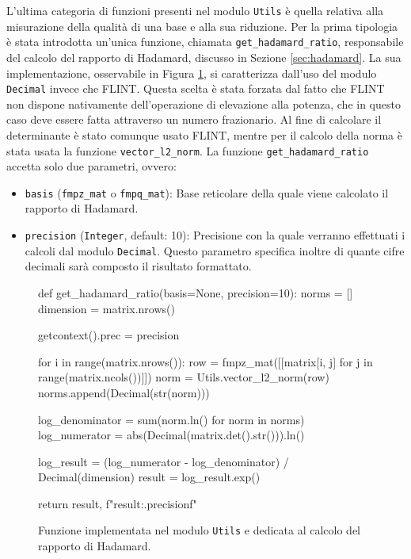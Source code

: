 L'ultima categoria di funzioni presenti nel modulo \texttt{Utils} è quella relativa alla
misurazione della qualità di una base e alla sua riduzione. Per la prima tipologia è 
stata introdotta un'unica funzione, chiamata \texttt{get\_hadamard\_ratio},
responsabile del calcolo del rapporto di Hadamard, discusso
in Sezione \ref{sec:hadamard}. La sua implementazione, osservabile in Figura 
\ref{fig:utilshadamard}, si caratterizza dall'uso del modulo \texttt{Decimal} invece che
FLINT. Questa scelta è stata forzata dal fatto che FLINT non dispone nativamente dell'operazione
di elevazione alla potenza, che in questo caso deve essere fatta attraverso un numero frazionario.
Al fine di calcolare il determinante è stato comunque usato FLINT, mentre per il calcolo 
della norma è stata usata la funzione \texttt{vector\_l2\_norm}. 
La funzione \texttt{get\_hadamard\_ratio} accetta solo due parametri, ovvero:
\begin{itemize}
    \item \texttt{basis} (\texttt{fmpz\_mat} o \texttt{fmpq\_mat}): Base reticolare della
    quale viene calcolato il rapporto di Hadamard.
    \item \texttt{precision} (\texttt{Integer}, default: 10): Precisione con la quale 
    verranno effettuati i calcoli dal modulo \texttt{Decimal}. Questo parametro specifica
    inoltre di quante cifre decimali sarà composto il risultato formattato. 
\end{itemize}

\begin{figure}[H]
    \begin{python}
        def get_hadamard_ratio(basis=None, precision=10):
            norms = []
            dimension = matrix.nrows()
            
            getcontext().prec = precision
            
            for i in range(matrix.nrows()):
                row = fmpz_mat([[matrix[i, j] 
                                for j in range(matrix.ncols())]])
                norm = Utils.vector_l2_norm(row)
                norms.append(Decimal(str(norm)))
            
            log_denominator = sum(norm.ln() for norm in norms)
            log_numerator = abs(Decimal(matrix.det().str())).ln()
            
            log_result = (log_numerator - log_denominator) /
                                                Decimal(dimension)
            result = log_result.exp()
            
            return result, f"{result:.{precision}f}"
    \end{python}
    \caption{Funzione implementata nel modulo \texttt{Utils} e dedicata al calcolo del rapporto
    di Hadamard.}
    \label{fig:utilshadamard}
\end{figure}


